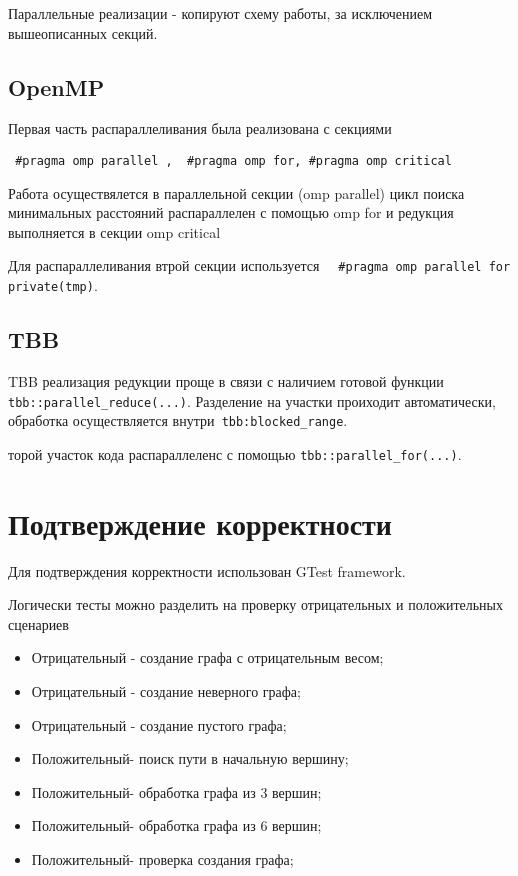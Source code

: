 \documentclass{report}
\begin{document}
\par Параллельные реализации - копируют схему работы, за исключением вышеописанных секций.

\subsection*{OpenMP}
Первая часть распараллеливания была реализована с секциями
\par \verb| #pragma omp parallel ,  #pragma omp for, #pragma omp critical|
\par Работа осуществялется в параллельной секции (omp parallel) цикл поиска минимальных расстояний распараллелен с помощью omp for и редукция выполняется в секции omp critical
\par Для распараллеливания втрой секции используется \verb|  #pragma omp parallel for private(tmp)|.

\subsection*{TBB}
TBB реализация редукции проще в связи с наличием готовой функции \verb|tbb::parallel_reduce(...)|. Разделение на участки проиходит автоматически, обработка осуществляется внутри\verb| tbb:blocked_range|.
\par торой участок кода распараллеленс с помощью  \verb|tbb::parallel_for(...)|.


\newpage


\section*{Подтверждение корректности}
Для подтверждения корректности использован GTest framework.
\par Логически тесты можно разделить на проверку отрицательных и положительных сценариев
\begin{itemize}
\item Отрицательный - создание графа с отрицательным весом;
\item Отрицательный - создание неверного графа;
\item Отрицательный - создание пустого графа;
\item Положительный- поиск пути в начальную вершину;
\item Положительный- обработка графа из 3 вершин;
\item Положительный- обработка графа из 6 вершин;
\item Положительный- проверка создания графа;
\end{itemize}
\end{document}
